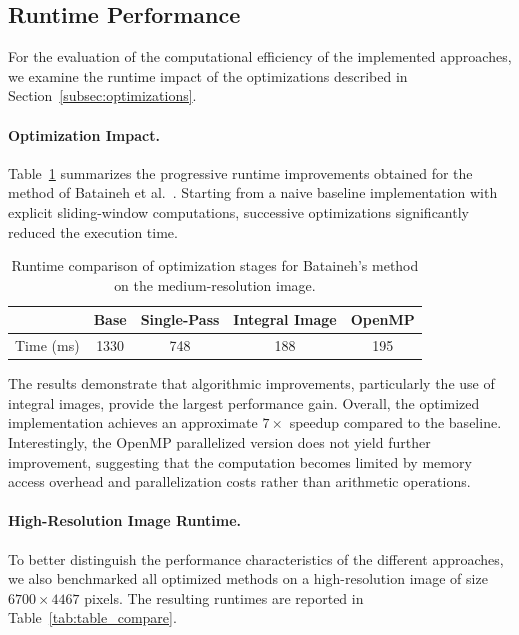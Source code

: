 \subsection{Runtime Performance}\label{subsec:runtime_perf}

For the evaluation of the computational efficiency of the implemented approaches, we examine the runtime impact of the optimizations described in Section~\ref{subsec:optimizations}.

\paragraph{Optimization Impact.}
Table~\ref{tab:table_bataineh} summarizes the progressive runtime improvements obtained for the method of Bataineh et al.~\cite{Bataineh2011}.
Starting from a naive baseline implementation with explicit sliding-window computations, successive optimizations significantly reduced the execution time.

\begin{table}[t]
    \begin{tabular}{lcccc}
                  & Base & Single-Pass & Integral Image & OpenMP \\
        \hline
        Time (ms) & 1330 & 748         & 188            & 195
    \end{tabular}
    \caption{Runtime comparison of optimization stages for Bataineh's method on the medium-resolution image.}
    \label{tab:table_bataineh}
\end{table}

The results demonstrate that algorithmic improvements, particularly the use of integral images, provide the largest performance gain.
Overall, the optimized implementation achieves an approximate $7\times$ speedup compared to the baseline.
Interestingly, the OpenMP parallelized version does not yield further improvement, suggesting that the computation becomes limited by memory access overhead and parallelization costs rather than arithmetic operations.

\paragraph{High-Resolution Image Runtime.}
To better distinguish the performance characteristics of the different approaches, we also benchmarked all optimized methods on a high-resolution image of size $6700 \times 4467$ pixels.
The resulting runtimes are reported in Table~\ref{tab:table_compare}.

